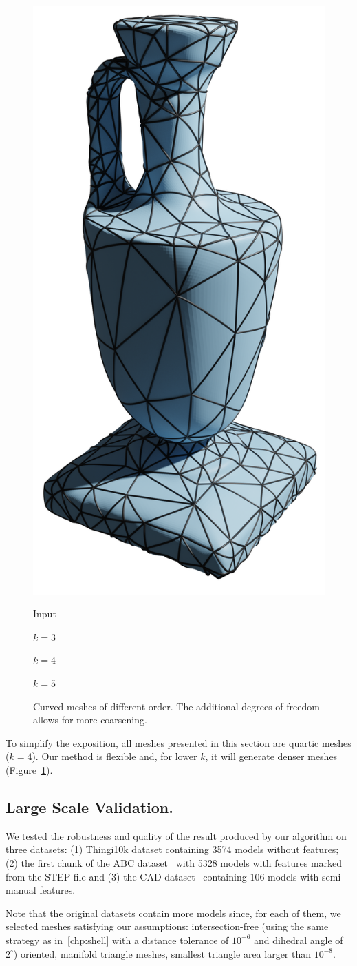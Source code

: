 \begin{figure}
    \includegraphics[width=.23\linewidth]{curve_meshing_in_shell_tex/figs/anphora/0003}
     \parbox{.24\linewidth}{\centering Input}\hfill
    \parbox{.24\linewidth}{\centering $k=3$}\hfill
    \parbox{.24\linewidth}{\centering $k=4$}\hfill
    \parbox{.24\linewidth}{\centering $k=5$}
    \caption{Curved meshes of different order. The additional degrees of freedom allows for more coarsening.}
    \label{bichon:fig:diff-k}
\end{figure}

To simplify the exposition, all meshes presented in this section are quartic meshes ($k=4$). Our method is flexible and, for lower $k$, it will generate denser meshes (Figure~\ref{bichon:fig:diff-k}).

\subsection{Large Scale Validation.}

We tested the robustness and quality of the result produced by our algorithm on three datasets: (1) Thingi10k dataset \cite{zhou2016thingi10k} containing 3574 models without features; (2) the first chunk {of} the ABC dataset~\cite{koch2019abc} with 5328 models with features marked from the STEP file and (3) the CAD dataset~\cite{Gao:2019} containing 106 models with semi-manual features.

Note that the original datasets contain more models since, for each of them, we selected meshes satisfying our assumptions: intersection-free (using the same strategy as in~\ref{chp:shell} with a distance tolerance of $10^{-6}$ and dihedral angle of $2^\circ$) oriented, manifold triangle meshes, smallest triangle area larger than $10^{-8}$. 





